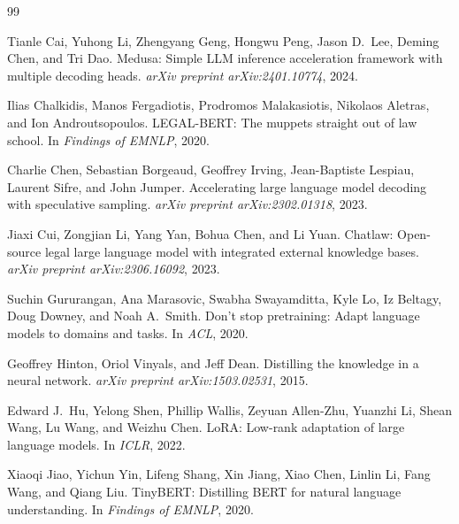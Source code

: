 \documentclass[11pt,a4paper]{article}
\begin{document}

\begin{thebibliography}{99}

Tianle Cai, Yuhong Li, Zhengyang Geng, Hongwu Peng, Jason D.\ Lee, Deming
Chen, and Tri Dao.
\newblock Medusa: Simple LLM inference acceleration framework with multiple
  decoding heads.
\newblock \emph{arXiv preprint arXiv:2401.10774}, 2024.

Ilias Chalkidis, Manos Fergadiotis, Prodromos Malakasiotis, Nikolaos Aletras,
and Ion Androutsopoulos.
\newblock LEGAL-BERT: The muppets straight out of law school.
\newblock In \emph{Findings of EMNLP}, 2020.

Charlie Chen, Sebastian Borgeaud, Geoffrey Irving, Jean-Baptiste Lespiau,
Laurent Sifre, and John Jumper.
\newblock Accelerating large language model decoding with speculative sampling.
\newblock \emph{arXiv preprint arXiv:2302.01318}, 2023.

Jiaxi Cui, Zongjian Li, Yang Yan, Bohua Chen, and Li Yuan.
\newblock Chatlaw: Open-source legal large language model with integrated
  external knowledge bases.
\newblock \emph{arXiv preprint arXiv:2306.16092}, 2023.

Suchin Gururangan, Ana Marasovic, Swabha Swayamditta, Kyle Lo, Iz Beltagy,
Doug Downey, and Noah A.\ Smith.
\newblock Don't stop pretraining: Adapt language models to domains and tasks.
\newblock In \emph{ACL}, 2020.

Geoffrey Hinton, Oriol Vinyals, and Jeff Dean.
\newblock Distilling the knowledge in a neural network.
\newblock \emph{arXiv preprint arXiv:1503.02531}, 2015.

Edward J.\ Hu, Yelong Shen, Phillip Wallis, Zeyuan Allen-Zhu, Yuanzhi Li,
Shean Wang, Lu Wang, and Weizhu Chen.
\newblock LoRA: Low-rank adaptation of large language models.
\newblock In \emph{ICLR}, 2022.

Xiaoqi Jiao, Yichun Yin, Lifeng Shang, Xin Jiang, Xiao Chen, Linlin Li,
Fang Wang, and Qiang Liu.
\newblock TinyBERT: Distilling BERT for natural language understanding.
\newblock In \emph{Findings of EMNLP}, 2020.


\end{thebibliography}
\end{document}
